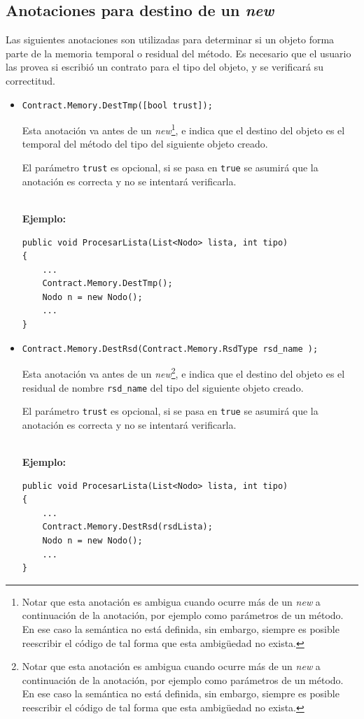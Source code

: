 \documentclass[12pt,a4paper]{article}
\newcommand\mono[1]{\texttt{#1}}
\begin{document}
		\subsection{Anotaciones para destino de un \textit{new}}
			Las siguientes anotaciones son utilizadas para determinar si un objeto forma parte de la memoria temporal o residual del método. Es necesario que el usuario las provea si escribió un contrato para el tipo del objeto, y se verificará su correctitud.

			\begin{itemize}
				\item
					\mono{Contract.Memory.DestTmp([bool trust]);}

					Esta anotación va antes de un \textit{new}\footnote{Notar que esta anotación es ambigua cuando ocurre más de un \textit{new} a continuación de la anotación, por ejemplo como parámetros de un método. En ese caso la semántica no está definida, sin embargo, siempre es posible reescribir el código de tal forma que esta ambigüedad no exista.}, e indica que el destino del objeto es el temporal del método del tipo del siguiente objeto creado.

					El parámetro \mono{trust} es opcional, si se pasa en \mono{true} se asumirá que la anotación es correcta y no se intentará verificarla.

					\noindent\\
					\textbf{Ejemplo:}
					\begin{footnotesize}
					\begin{lstlisting}[caption=Ejemplo de \mono{Contract.Memory.DestTmp},numbers=none]
public void ProcesarLista(List<Nodo> lista, int tipo)
{
	...
	Contract.Memory.DestTmp();
	Nodo n = new Nodo();
	...
}
					\end{lstlisting}
					\end{footnotesize}
				\item
					\mono{Contract.Memory.DestRsd(Contract.Memory.RsdType rsd\_name \newline [, bool trust]);}

					Esta anotación va antes de un \textit{new}\footnote{Notar que esta anotación es ambigua cuando ocurre más de un \textit{new} a continuación de la anotación, por ejemplo como parámetros de un método. En ese caso la semántica no está definida, sin embargo, siempre es posible reescribir el código de tal forma que esta ambigüedad no exista.}, e indica que el destino del objeto es el residual de nombre \mono{rsd\_name} del tipo del siguiente objeto creado.

					El parámetro \mono{trust} es opcional, si se pasa en \mono{true} se asumirá que la anotación es correcta y no se intentará verificarla.

					\noindent\\
					\textbf{Ejemplo:}
					\begin{footnotesize}
					\begin{lstlisting}[caption=Ejemplo de \mono{Contract.Memory.DestRsd},numbers=none]
public void ProcesarLista(List<Nodo> lista, int tipo)
{
	...
	Contract.Memory.DestRsd(rsdLista);
	Nodo n = new Nodo();
	...
}
					\end{lstlisting}
					\end{footnotesize}
			\end{itemize}
\end{document}

